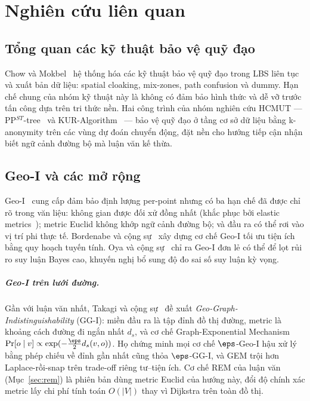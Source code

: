\chapter{Nghiên cứu liên quan}
\label{ch:lienquan}

\section{Tổng quan các kỹ thuật bảo vệ quỹ đạo}

Chow và Mokbel~\cite{chow2011trajectory} hệ thống hóa các kỹ thuật bảo vệ quỹ đạo
trong LBS liên tục và xuất bản dữ liệu: spatial cloaking, mix-zones, path
confusion và dummy. Hạn chế chung của nhóm kỹ thuật này là không có đảm bảo hình
thức và dễ vỡ trước tấn công dựa trên tri thức nền. Hai công trình của nhóm
nghiên cứu HCMUT --- PP$^{ST}$-tree~\cite{phan2012ppst} và
KUR-Algorithm~\cite{phan2015kur} --- bảo vệ quỹ đạo ở tầng cơ sở dữ liệu bằng
k-anonymity trên các vùng dự đoán chuyển động, đặt nền cho hướng tiếp cận nhận
biết ngữ cảnh đường bộ mà luận văn kế thừa.

\section{Geo-I và các mở rộng}

Geo-I~\cite{andres2013geo} cung cấp đảm bảo định lượng per-point nhưng có ba hạn
chế đã được chỉ rõ trong văn liệu: không gian được đối xử đồng nhất
(khắc phục bởi elastic metrics~\cite{chatzikokolakis2015elastic}); metric Euclid
không khớp ngữ cảnh đường bộ; và đầu ra có thể rơi vào vị trí phi thực tế.
Bordenabe và cộng sự~\cite{bordenabe2014optimal} xây dựng cơ chế Geo-I tối ưu
tiện ích bằng quy hoạch tuyến tính. Oya và cộng sự~\cite{oya2017back} chỉ ra
Geo-I đơn lẻ có thể để lọt rủi ro suy luận Bayes cao, khuyến nghị bổ sung độ đo
sai số suy luận kỳ vọng.

\paragraph{Geo-I trên lưới đường.} Gần với luận văn nhất,
Takagi và cộng sự~\cite{takagi2019geo} đề xuất
\emph{Geo-Graph-Indistinguishability} (GG-I): miền đầu ra là tập đỉnh đồ thị
đường, metric là khoảng cách đường đi ngắn nhất $d_s$, và cơ chế
Graph-Exponential Mechanism $\Pr[o \mid v] \propto \exp(-\tfrac{\eps}{2} d_s(v,o))$.
Họ chứng minh mọi cơ chế $\eps$-Geo-I hậu xử lý bằng phép chiếu về đỉnh gần nhất
cũng thỏa $\eps$-GG-I, và GEM trội hơn Laplace-rồi-snap trên trade-off riêng
tư--tiện ích. Cơ chế REM của luận văn (Mục~\ref{sec:rem}) là phiên bản dùng
metric Euclid của hướng này, đổi độ chính xác metric lấy chi phí tính toán
$O(|V|)$ thay vì Dijkstra trên toàn đồ thị.

